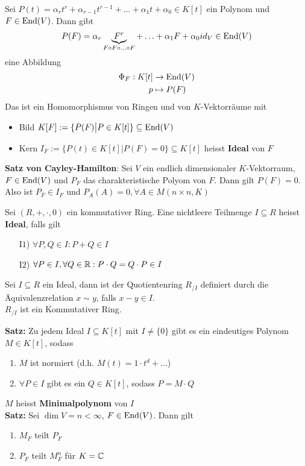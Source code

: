\begin{mdframed}
Sei $P(t) = \alpha_rt^r + \alpha_{r-1}t^{r-1} + \ldots + \alpha_{1}t + \alpha_0 \in K[t]$ ein Polynom und $F \in \text{End}(V)$. Dann gibt
\begin{align*}
    P(F) = \alpha_r \underbrace{F^r}_{F \circ F \circ \ldots \circ F} + \ldots + \alpha_1F + \alpha_0id_V \in \text{End}(V)
\end{align*}
eine Abbildung
\begin{align*}
    \Phi_F: K[t] &\rightarrow \text{End}(V) \\
    p &\mapsto P(F)
\end{align*}
Das ist ein Homomorphismus von Ringen und von $K$-Vektorräume mit 

\begin{itemize}
    \item Bild $K[F] := \{P(F) \big\vert P \in K[t]\} \subseteq \text{End}(V)$
    
    \item Kern $I_F:= \{P(t) \in K[t] \big\vert P(F) = 0\} \subseteq K[t]$ heisst \textbf{Ideal} von $F$
\end{itemize}
\end{mdframed}
\begin{mdframed}
\textbf{Satz von Cayley-Hamilton}: \quad Sei $V$ ein endlich dimensionaler $K$-Vektorraum, $F \in \text{End}(V)$ und $P_F$ das charakteristische Polyom von $F$. Dann gilt $P(F) = 0$. Also ist $P_F \in I_F$ und $P_A(A) = 0, \forall A \in M(n\times n,K)$
\end{mdframed}
\begin{mdframed}
Sei $(R, +, \cdot, 0)$ ein kommutativer Ring. Eine nichtleere Teilmenge $I \subseteq R$ heisst \textbf{Ideal}, falls gilt
\begin{itemize}
    \item[I$1$)] $\forall P, Q \in I: P + Q \in I$
    
    \item[I$2$)] $\forall P \in I, \forall Q \in \mathbb{R}: P \cdot Q = Q \cdot P \in I$
\end{itemize}
Sei $I \subseteq R$ ein Ideal, dann ist der Quotientenring $R_{/I}$ definiert durch die Äquivalenzrelation $x \sim y$, falls $x-y \in I$.\\
$R_{/I}$ ist ein Kommutativer Ring.
\end{mdframed}
\textbf{Satz:} \quad Zu jedem Ideal $I \subseteq K[t]$ mit $I \neq \{0\}$ gibt es ein eindeutiges Polynom $M \in K[t]$, sodass
\begin{enumerate}[{(}a{)}]
    \item $M$ ist normiert (d.h. $M(t) = 1 \cdot t^d + \ldots$)
    
    \item $\forall P \in I$ gibt es ein $Q \in K[t]$, sodass $P = M \cdot Q$
\end{enumerate}
$M$ heisst \textbf{Minimalpolynom} von $I$\\
\textbf{Satz:} \quad Sei $\dim V = n < \infty$, $F \in \text{End}(V)$. Dann gilt
\begin{enumerate}[{(}a{)}]
    \item $M_F$ teilt $P_F$
    
    \item $P_F$ teilt $M_F^n$ für $K = \mathbb{C}$
\end{enumerate}

